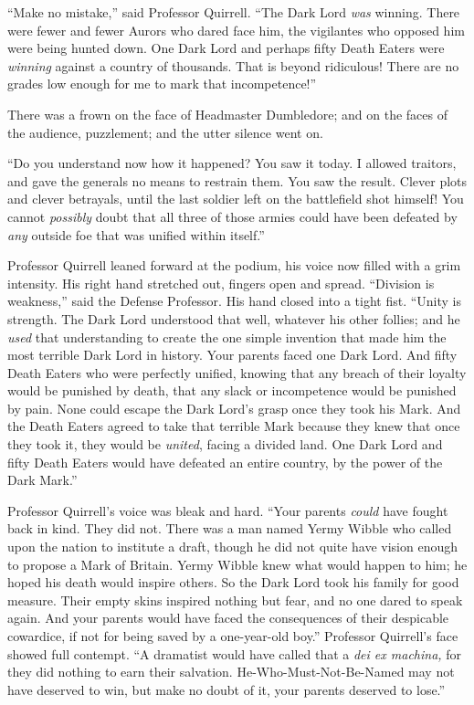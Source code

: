 ``Make no mistake,'' said Professor Quirrell. ``The Dark Lord \emph{was} winning. There were fewer and fewer Aurors who dared face him, the vigilantes who opposed him were being hunted down. One Dark Lord and perhaps fifty Death Eaters were \emph{winning} against a country of thousands. That is beyond ridiculous! There are no grades low enough for me to mark that incompetence!''

There was a frown on the face of Headmaster Dumbledore; and on the faces of the audience, puzzlement; and the utter silence went on.

``Do you understand now how it happened? You saw it today. I allowed traitors, and gave the generals no means to restrain them. You saw the result. Clever plots and clever betrayals, until the last soldier left on the battlefield shot himself! You cannot \emph{possibly} doubt that all three of those armies could have been defeated by \emph{any} outside foe that was unified within itself.''

Professor Quirrell leaned forward at the podium, his voice now filled with a grim intensity. His right hand stretched out, fingers open and spread. ``Division is weakness,'' said the Defense Professor. His hand closed into a tight fist. ``Unity is strength. The Dark Lord understood that well, whatever his other follies; and he \emph{used} that understanding to create the one simple invention that made him the most terrible Dark Lord in history. Your parents faced one Dark Lord. And fifty Death Eaters who were perfectly unified, knowing that any breach of their loyalty would be punished by death, that any slack or incompetence would be punished by pain. None could escape the Dark Lord's grasp once they took his Mark. And the Death Eaters agreed to take that terrible Mark because they knew that once they took it, they would be \emph{united}, facing a divided land. One Dark Lord and fifty Death Eaters would have defeated an entire country, by the power of the Dark Mark.''

Professor Quirrell's voice was bleak and hard. ``Your parents \emph{could} have fought back in kind. They did not. There was a man named Yermy Wibble who called upon the nation to institute a draft, though he did not quite have vision enough to propose a Mark of Britain. Yermy Wibble knew what would happen to him; he hoped his death would inspire others. So the Dark Lord took his family for good measure. Their empty skins inspired nothing but fear, and no one dared to speak again. And your parents would have faced the consequences of their despicable cowardice, if not for being saved by a one-year-old boy.'' Professor Quirrell's face showed full contempt. ``A dramatist would have called that a \emph{dei ex machina,} for they did nothing to earn their salvation. He-Who-Must-Not-Be-Named may not have deserved to win, but make no doubt of it, your parents deserved to lose.''

